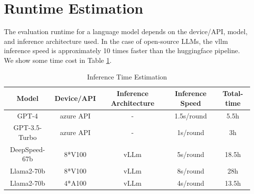 \section{Runtime Estimation\label{appendix: run time}}
The evaluation runtime for a language model depends on the device/API, model, and inference architecture used. In the case of open-source LLMs, the vllm inference speed is approximately 10 times faster than the huggingface pipeline. We show some time cost in Table \ref{tab: runtime_estimation}.

\begin{table}[t!]
\centering
\begin{tabular}{ccccc}
\hline
\textbf{Model}       & \textbf{Device/API} & \textbf{Inference Architecture} & \textbf{Inference Speed} & \textbf{Total-time} \\ \hline
GPT-4                 & azure API           & -                               & 1.5s/round               & 5.5h                \\ 
GPT-3.5-Turbo        & azure API           & -                               & 1s/round                 & 3h                  \\ 
DeepSpeed-67b        & 8*V100              & vLLm                            & 5s/round                 & 18.5h               \\
Llama2-70b           & 8*V100              & vLLm                            & 8s/round                 & 28h                 \\ 
Llama2-70b           & 4*A100              & vLLm                            & 4s/round                 & 13.5h               \\ \hline
\end{tabular}
\caption{Inference Time Estimation}
\label{tab: runtime_estimation}
\end{table}



